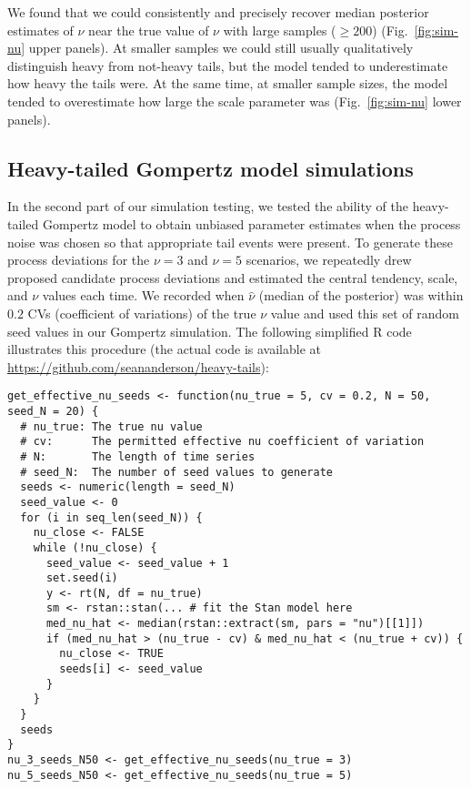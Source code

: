 We found that we could consistently and precisely recover median posterior estimates of $\nu$ near the true value of $\nu$ with large samples ($\ge 200$) (Fig.~\ref{fig:sim-nu} upper panels). At smaller samples we could still usually qualitatively distinguish heavy from not-heavy tails, but the model tended to underestimate how heavy the tails were. At the same time, at smaller sample sizes, the model tended to overestimate how large the scale parameter was (Fig.~\ref{fig:sim-nu} lower panels).

\subsection{Heavy-tailed Gompertz model simulations}

In the second part of our simulation testing, we tested the ability of the heavy-tailed Gompertz model to obtain unbiased parameter estimates when the process noise was chosen so that appropriate tail events were present. To generate these process deviations for the $\nu = 3$ and $\nu = 5$ scenarios, we repeatedly drew proposed candidate process deviations and estimated the central tendency, scale, and $\nu$ values each time. We recorded when $\hat{\nu}$ (median of the posterior) was within $0.2$ CVs (coefficient of variations) of the true $\nu$ value and used this set of random seed values in our Gompertz simulation. The following simplified R code illustrates this procedure (the actual code is available at \url{https://github.com/seananderson/heavy-tails}):

\begin{footnotesize}
\begin{verbatim}
get_effective_nu_seeds <- function(nu_true = 5, cv = 0.2, N = 50, seed_N = 20) {
  # nu_true: The true nu value
  # cv:      The permitted effective nu coefficient of variation
  # N:       The length of time series
  # seed_N:  The number of seed values to generate
  seeds <- numeric(length = seed_N)
  seed_value <- 0
  for (i in seq_len(seed_N)) {
    nu_close <- FALSE
    while (!nu_close) {
      seed_value <- seed_value + 1
      set.seed(i)
      y <- rt(N, df = nu_true)
      sm <- rstan::stan(... # fit the Stan model here
      med_nu_hat <- median(rstan::extract(sm, pars = "nu")[[1]])
      if (med_nu_hat > (nu_true - cv) & med_nu_hat < (nu_true + cv)) {
        nu_close <- TRUE
        seeds[i] <- seed_value
      }
    }
  }
  seeds
}
nu_3_seeds_N50 <- get_effective_nu_seeds(nu_true = 3)
nu_5_seeds_N50 <- get_effective_nu_seeds(nu_true = 5)
\end{verbatim}
\end{footnotesize}

